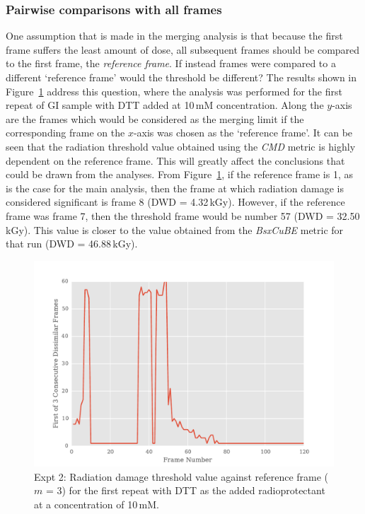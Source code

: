 \subsubsection{Pairwise comparisons with all frames}
\label{subs:Pairwise comparisons with all frames}
One assumption that is made in the merging analysis is that because the first frame suffers the least amount of dose, all subsequent frames should be compared to the first frame, the \textit{reference frame}.
If instead frames were compared to a different `reference frame' would the threshold be different?
The results shown in Figure~\ref{fig:First n diff frames - DTT} address this question, where the analysis was performed for the first repeat of GI sample with DTT added at 10$\,$mM concentration.
Along the $y$-axis are the frames which would be considered as the merging limit if the corresponding frame on the $x$-axis was chosen as the `reference frame'.
It can be seen that the radiation threshold value obtained using the \textit{CMD} metric is highly dependent on the reference frame.
This will greatly affect the conclusions that could be drawn from the analyses.
From Figure~\ref{fig:First n diff frames - DTT}, if the reference frame is 1, as is the case for the main analysis, then the frame at which radiation damage is considered significant is frame 8 (DWD = 4.32$\,$kGy).
However, if the reference frame was frame 7, then the threshold frame would be number 57 (DWD = 32.50\,kGy).
This value is closer to the value obtained from the \textit{BsxCuBE} metric for that run (DWD = 46.88\,kGy).
\begin{figure}
    \centering
    \includegraphics[width=1.0\textwidth]{figures/saxs/dtt_first_n_plot.pdf}
    \caption[Radiation damage threshold value against reference frame ($m$ = 3) for the first repeat with DTT as the added radioprotectant at a concentration of 10\,mM.]{Expt 2: Radiation damage threshold value against reference frame ($m$ = 3) for the first repeat with DTT as the added radioprotectant at a concentration of 10\,mM.}
    \label{fig:First n diff frames - DTT}
\end{figure}

